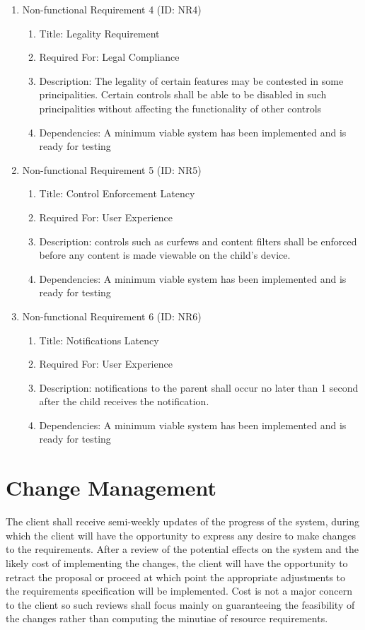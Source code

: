 \documentclass[12pt]{article}
\begin{document}
\begin{enumerate}
\begin{enumerate}
    \end{enumerate}
    \item Non-functional Requirement 4 (ID: NR4)
    \begin{enumerate}
        \item Title: Legality  Requirement
        \item Required For: Legal Compliance
        \item Description:  The legality of certain features may be contested in some principalities. Certain controls
        shall be able to be disabled in such principalities without affecting the functionality of other controls
        \item Dependencies: A minimum viable system has been implemented and is ready for testing
    \end{enumerate}
    \item Non-functional Requirement 5 (ID: NR5)
    \begin{enumerate}
        \item Title: Control Enforcement Latency
        \item Required For: User Experience
        \item Description:  controls such as curfews and content filters shall be enforced before any content is made
        viewable on the child’s device.
        \item Dependencies: A minimum viable system has been implemented and is ready for testing
    \end{enumerate}
    \item Non-functional Requirement 6 (ID: NR6)
    \begin{enumerate}
        \item Title: Notifications Latency
        \item Required For: User Experience
        \item Description:   notifications to the parent shall occur no later than 1 second after the child receives
        the notification.
        \item Dependencies: A minimum viable system has been implemented and is ready for testing
    \end{enumerate}
\end{enumerate}

\section{Change Management}

The client shall receive semi-weekly updates of the progress of the system, during which the client will have the
opportunity to express any desire to make changes to the requirements. After a review of the potential effects on
the system and the likely cost of implementing the changes, the client will have the opportunity to retract the
proposal or proceed at which point the appropriate adjustments to the requirements specification will be implemented.
Cost is not a major concern to the client so such reviews shall focus mainly on guaranteeing the feasibility of the
changes rather than computing the minutiae of resource requirements.
\end{document}

